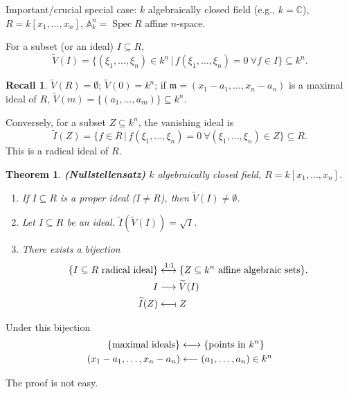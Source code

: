 \documentclass[12pt]{article}
\DeclareMathOperator{\Spec}{Spec}
\newtheorem*{theorem}{Theorem}
\theoremstyle{definition}
\newtheorem*{recall}{Recall}
\begin{document}
Important/crucial special case: $k$ algebraically closed field (e.g., $k=\mathbb C$), $R=k[x_1,\ldots,x_n]$, $\mathbb A_k^n=\Spec R$ affine $n$-space.

For a subset (or an ideal) $I\subseteq R$,
\[\widetilde V(I)=\big\{(\xi_1,\ldots,\xi_n)\in k^n\,\big|\,f(\xi_1,\ldots,\xi_n)=0\ \forall f\in I\big\}\subseteq k^n.\]

\begin{recall}
$\widetilde V(R)=\emptyset$; $\widetilde V(0)=k^n$; if $\mathfrak m=(x_1-a_1,\ldots,x_n-a_n)$ is a maximal ideal of $R$, $\widetilde V(m)=\{(a_1,\ldots,a_m)\}\subseteq k^n$.
\end{recall}

Conversely, for a subset $Z\subseteq k^n$, the vanishing ideal is
\[\widetilde I(Z)=\big\{f\in R\,\big|\,f(\xi_1,\ldots,\xi_n)=0\ \forall(\xi_1,\ldots,\xi_n)\in Z\big\}\subseteq R.\]
This is a radical ideal of $R$.

\begin{theorem}
\emph{\textbf{(Nullstellensatz)}} $k$ algebraically closed field, $R=k[x_1,\ldots,x_n]$.

\begin{enumerate}[label=\arabic*)]
\item If $I\subseteq R$ is a proper ideal ($I\neq R$), then $\widetilde V(I)\neq\emptyset$.

\item Let $I\subseteq R$ be an ideal. $\widetilde I(\widetilde V(I))=\sqrt I$.

\item There exists a bijection
\begin{align*}
\{I\subseteq R\text{ radical ideal}\}&\xleftrightarrow{1:1}\{Z\subseteq k^n\text{ affine algebraic sets}\}.\\I&\longrightarrow\widetilde V(I)\\\widetilde I(Z)&\longleftarrow\!\shortmid Z
\end{align*}
\end{enumerate}
\end{theorem}

Under this bijection
\begin{align*}
\{\text{maximal ideals}\}&\xleftrightarrow{\hspace{4.4mm}}\{\text{points in }k^n\}\\(x_1-a_1,\ldots,x_n-a_n)&\longleftarrow(a_1,\ldots,a_n)\in k^n
\end{align*}

The proof is not easy.
\end{document}
